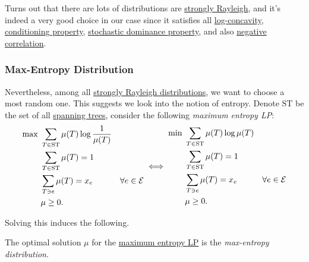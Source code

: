 Turns out that there are lots of distributions are \hyperref[def:strongly-Rayleigh-distribution]{strongly Rayleigh}, and it's indeed a very good choice in our case since it satisfies  all \hyperref[subsub:log-concavity]{log-concavity}, \hyperref[subsub:conditioning]{conditioning property}, \hyperref[subsub:stochastic-dominance]{stochastic dominance property}, and also \hyperref[subsub:negative-correlation]{negative correlation}.

\subsubsection{Max-Entropy Distribution}
Nevertheless, among all \hyperref[def:strongly-Rayleigh-distribution]{strongly Rayleigh distributions}, we want to choose a most random one. This suggests we look into the notion of entropy. Denote \(\mathrm{ST}\) be the set of all \hyperref[def:spanning-tree]{spanning trees}, consider the following \emph{maximum entropy LP}:
\begin{equation}\label{eq:max-entropy}
	\begin{aligned}
		\max~ & \sum_{T\in \mathrm{ST}} \mu (T) \log \frac{1}{\mu (T)}                                            \\
		      & \sum_{T\in \mathrm{ST} } \mu (T) = 1                                                              \\
		      & \sum_{T \ni e} \mu (T) = x_e                           & \forall e\in \mathcal{\MakeUppercase{e}} \\
		      & \mu \geq 0.
	\end{aligned} \iff
	\begin{aligned}
		\min~ & \sum_{T\in \mathrm{ST}} \mu (T) \log \mu (T)                                            \\
		      & \sum_{T\in \mathrm{ST} } \mu (T) = 1                                                    \\
		      & \sum_{T \ni e} \mu (T) = x_e                 & \forall e\in \mathcal{\MakeUppercase{e}} \\
		      & \mu \geq 0.
	\end{aligned}
\end{equation}

Solving this induces the following.
\begin{definition}\label{def:max-entropy-distribution}
	The optimal solution \(\mu \) for the \hyperref[eq:max-entropy]{maximum entropy LP} is the \emph{max-entropy distribution}.
\end{definition}

